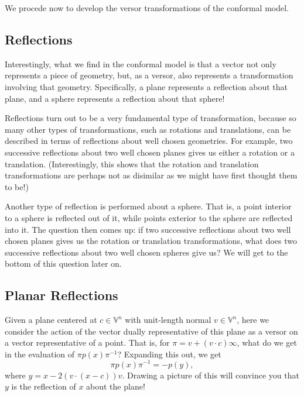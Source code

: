 \documentclass[12pt]{article}
\newcommand{\V}{\mathbb{V}}
\newcommand{\nvai}{\infty}
\begin{document}
We procede now to develop the versor transformations of the conformal model.

\subsection{Reflections}

Interestingly, what we find in the conformal model is that a vector
not only represents a piece of geometry, but, as a versor, also represents
a transformation involving that geometry.  Specifically, a plane represents
a reflection about that plane, and a sphere represents a reflection about that
sphere!

Reflections turn out to be a very fundamental type of transformation, because
so many other types of transformations, such as rotations and translations, can be described
in terms of reflections about well chosen geometries.  For example, two
successive reflections about two well chosen planes gives us either a rotation
or a translation.  (Interestingly, this shows that the rotation and translation
transformations are perhaps not as disimilar as we might have first thought them to be!)

Another type of reflection is performed about a sphere.  That is, a point
interior to a sphere is reflected out of it, while points exterior to the sphere
are reflected into it.  The question then comes up: if two successive
reflections about two well chosen planes gives us the rotation or
translation transformations, what does two successive reflections about
two well chosen spheres give us?  We will get to the bottom of this question later on.

\subsection{Planar Reflections}\label{sec_planar_reflections}

Given a plane centered at $c\in\V^n$ with unit-length normal $v\in\V^n$,
here we consider the action of the vector dually representative of this plane
as a versor on a vector representative of a point.  That is, for $\pi=v+(v\cdot c)\nvai$,
what do we get in the evaluation of $\pi p(x)\pi^{-1}$?  Expanding this out, we get
\begin{equation*}
\pi p(x)\pi^{-1} = -p(y),
\end{equation*}
where $y=x-2(v\cdot (x-c))v$.  Drawing a picture
of this will convince you that $y$ is the reflection of $x$ about the plane!
\end{document}
